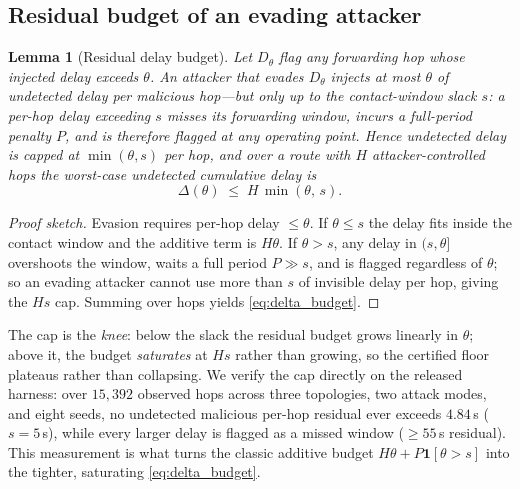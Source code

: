 \documentclass[conference]{IEEEtran}
\newtheorem{lemma}{Lemma}
\begin{document}
\subsection{Residual budget of an evading attacker}
\begin{lemma}[Residual delay budget]
\label{lem:residual}
Let $D_\theta$ flag any forwarding hop whose injected delay exceeds $\theta$. An
attacker that evades $D_\theta$ injects at most $\theta$ of undetected delay per
malicious hop---but only up to the contact-window slack $s$: a per-hop delay
exceeding $s$ misses its forwarding window, incurs a full-period penalty $P$, and
is therefore flagged at \emph{any} operating point. Hence undetected delay is
capped at $\min(\theta,s)$ per hop, and over a route with $H$ attacker-controlled
hops the worst-case undetected cumulative delay is
\begin{equation}
\label{eq:delta_budget}
\Delta(\theta) \;\le\; H\,\min(\theta,\,s).
\end{equation}
\end{lemma}
\begin{proof}[Proof sketch]
Evasion requires per-hop delay $\le\theta$. If $\theta\le s$ the delay fits inside
the contact window and the additive term is $H\theta$. If $\theta>s$, any delay in
$(s,\theta]$ overshoots the window, waits a full period $P\gg s$, and is flagged
regardless of $\theta$; so an evading attacker cannot use more than $s$ of
invisible delay per hop, giving the $H s$ cap. Summing over hops yields
\eqref{eq:delta_budget}.
\end{proof}
The cap is the \emph{knee}: below the slack the residual budget grows linearly in
$\theta$; above it, the budget \emph{saturates} at $Hs$ rather than growing, so
the certified floor plateaus rather than collapsing. We verify the cap directly
on the released harness: over $15{,}392$ observed hops across three topologies,
two attack modes, and eight seeds, no undetected malicious per-hop residual ever
exceeds $4.84$\,s ($s=5$\,s), while every larger delay is flagged as a missed
window ($\ge55$\,s residual). This measurement is what turns the classic additive
budget $H\theta+P\mathbf{1}[\theta>s]$ into the tighter, saturating
\eqref{eq:delta_budget}.
\end{document}
